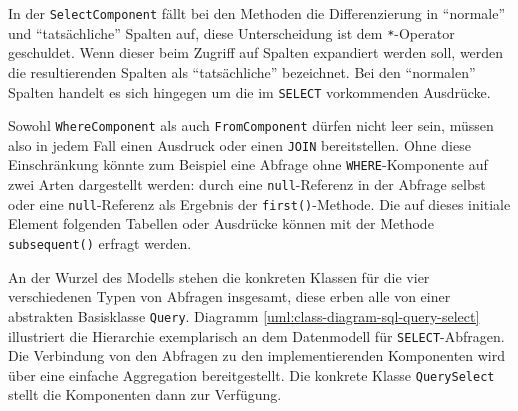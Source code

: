 In der \texttt{SelectComponent} fällt bei den Methoden die Differenzierung in "`normale"' und "`tatsächliche"' Spalten auf, diese Unterscheidung ist dem \texttt{*}-Operator geschuldet. Wenn dieser beim Zugriff auf Spalten expandiert werden soll, werden die resultierenden Spalten als "`tatsächliche"' bezeichnet. Bei den "`normalen"' Spalten handelt es sich hingegen um die im \texttt{SELECT} vorkommenden Ausdrücke.

Sowohl \texttt{WhereComponent} als auch \texttt{FromComponent} dürfen nicht leer sein, müssen also in jedem Fall einen Ausdruck oder einen \texttt{JOIN} bereitstellen. Ohne diese Einschränkung könnte zum Beispiel eine Abfrage ohne \texttt{WHERE}-Komponente auf zwei Arten dargestellt werden: durch eine \texttt{null}-Referenz in der Abfrage selbst oder eine \texttt{null}-Referenz als Ergebnis der \texttt{first()}-Methode. Die auf dieses initiale Element folgenden Tabellen oder Ausdrücke können mit der Methode \texttt{subsequent()} erfragt werden.

An der Wurzel des Modells stehen die konkreten Klassen für die vier verschiedenen Typen von Abfragen insgesamt, diese erben alle von einer abstrakten Basisklasse \texttt{Query}. Diagramm \ref{uml:class-diagram-sql-query-select} illustriert die Hierarchie exemplarisch an dem Datenmodell für \texttt{SELECT}-Abfragen. Die Verbindung von den Abfragen zu den implementierenden Komponenten wird über eine einfache Aggregation bereitgestellt. Die konkrete Klasse \texttt{QuerySelect} stellt die Komponenten dann zur Verfügung.


